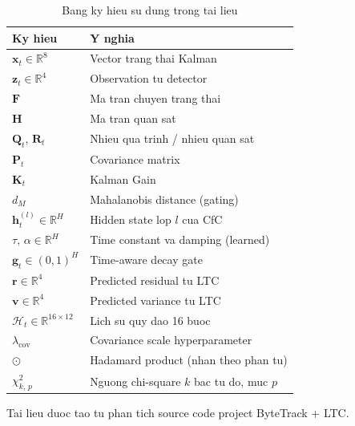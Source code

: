 \documentclass[12pt, a4paper]{article}
\newcommand{\mat}[1]{\mathbf{#1}}
\newcommand{\vect}[1]{\bm{#1}}
\begin{document}
\begin{table}[h!]
\centering
\renewcommand{\arraystretch}{1.4}
\begin{tabular}{@{}ll@{}}
  \toprule
  \textbf{Ky hieu} & \textbf{Y nghia} \\
  \midrule
  $\vect{x}_t \in \mathbb{R}^8$     & Vector trang thai Kalman \\
  $\vect{z}_t \in \mathbb{R}^4$     & Observation tu detector \\
  $\mat{F}$                          & Ma tran chuyen trang thai \\
  $\mat{H}$                          & Ma tran quan sat \\
  $\mat{Q}_t,\, \mat{R}_t$           & Nhieu qua trinh / nhieu quan sat \\
  $\mat{P}_t$                        & Covariance matrix \\
  $\mat{K}_t$                        & Kalman Gain \\
  $d_M$                              & Mahalanobis distance (gating) \\
  $\vect{h}_t^{(l)} \in \mathbb{R}^H$ & Hidden state lop $l$ cua CfC \\
  $\tau,\, \alpha \in \mathbb{R}^H$ & Time constant va damping (learned) \\
  $\vect{g}_t \in (0,1)^H$          & Time-aware decay gate \\
  $\vect{r} \in \mathbb{R}^4$        & Predicted residual tu LTC \\
  $\vect{v} \in \mathbb{R}^4$        & Predicted variance tu LTC \\
  $\mathcal{H}_t \in \mathbb{R}^{16 \times 12}$ & Lich su quy dao 16 buoc \\
  $\lambda_{\text{cov}}$             & Covariance scale hyperparameter \\
  $\odot$                            & Hadamard product (nhan theo phan tu) \\
  $\chi^2_{k,\,p}$                   & Nguong chi-square $k$ bac tu do, muc $p$ \\
  \bottomrule
\end{tabular}
\caption{Bang ky hieu su dung trong tai lieu}
\end{table}

\vfill
\begin{center}
\small\color{grey}
Tai lieu duoc tao tu phan tich source code project ByteTrack + LTC.
\end{center}
\end{document}
